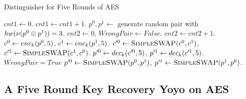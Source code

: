 \documentclass[notheorems]{beamer}
\theoremstyle{definition}
\theoremstyle{example}
\begin{document}
    \begin{frame}{Distinguisher for Five Rounds of AES}
        \begin{algorithm}[H]
            \algrenewcommand{}
            \tiny
            \caption{Distinguisher for Five Rounds of AES}
            \label{alg:aes-5-rounds}
            \begin{algorithmic}[1]
                \State \(cnt1 \gets 0\).
                    \State \(cnt1 \gets cnt1 + 1\).
                    \State \(p^0, p^1 \gets\) generate random pair with
                    \(hw(\nu(p^0 \oplus p^1)) = 3\).
                    \State \(cnt2 \gets 0\), \(WrongPair \gets False\).
                        \State \(cnt2 \gets cnt2 + 1\).
                        \State \(c^0 \gets enc_k(p^0, 5)\), \(c^1 \gets
                        enc_k(p^1, 5)\).
                        \State \(c^{\prime 0} \gets \textsc{SimpleSWAP}(c^0,
                        c^1)\), \(c^{\prime 1} \gets \textsc{SimpleSWAP}(c^1,
                        c^0)\).
                        \State \(p^{\prime 0} \gets dec_k(c^{\prime 0}, 5)\),
                        \(p^{\prime 1} \gets dec_k(c^{\prime 1}, 5)\).
                                \State \(WrongPair = True\)
                            \EndIf
                        \EndFor
                        \State \(p^{\prime 0} \gets \textsc{SimpleSWAP}(p^0,
                        p^1)\), \(p^{\prime 1} \gets \textsc{SimpleSWAP}(p^1,
                        p^0)\).
                    \EndWhile
                        \State {} 
                    \EndIf
                \EndWhile
                \State {}
            \end{algorithmic}
        \end{algorithm}
    \end{frame}

    \subsection{A Five Round Key Recovery Yoyo on AES}
    \label{subsec:aes-5-rounds-key}
\end{document}
